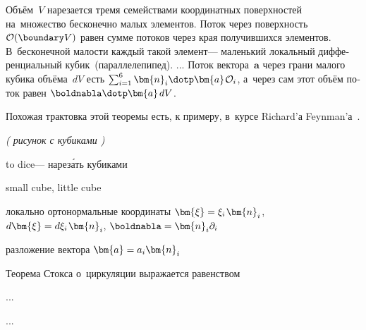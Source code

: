 \begin{otherlanguage}{russian}
Объём~$V$ нарезается тремя семействами координатных поверхностей на~множество бесконечно малых элементов. Поток через поверхность ${\mathcal{O}(\boundary V)}$ равен сумме потоков через края получившихся элементов. В~бесконечной малости каждый такой элемент\:--- маленький локальный дифференциальный кубик~(параллелепипед). ... Поток вектора~$\bm{a}$ через грани малого кубика объёма~$dV$ есть ${\sum_{i = 1}^{6} \bm{n}_i \dotp \bm{a} \hspace{.2ex} \mathcal{O}_i}$, а~через сам этот объём поток равен ${\boldnabla \dotp \bm{a} \hspace{.32ex} dV}$.

Похожая трактовка этой теоремы есть, к примеру, в~курсе Richard’а Feynman’а~\cite{feynman-lecturesonphysics}.

\emph{( рисунок с кубиками )}

to dice\:--- нарез\'{а}ть кубиками

small cube, little cube

локально ортонормальные координаты ${\bm{\xi} = \xi_i \hspace{.2ex} \bm{n}_i \hspace{.1ex}}$, ${d\bm{\xi} = d \xi_i \hspace{.2ex} \bm{n}_i}$, ${\boldnabla = \bm{n}_i \partial_i}$

разложение вектора ${\bm{a} = a_i \bm{n}_i \hspace{.1ex}}$

Теорема Стокса о~циркуляции выражается равенством

...

\newpage ...



\end{otherlanguage}



\newpage



\label{para:curvaturetensors}

